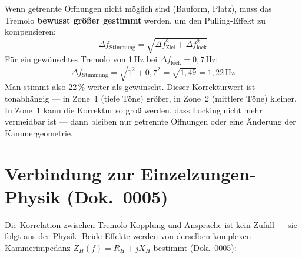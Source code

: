 \documentclass[11pt,a4paper]{article}
\begin{document}
Wenn getrennte Öffnungen nicht möglich sind (Bauform, Platz), muss das Tremolo \textbf{bewusst größer gestimmt} werden, um den Pulling-Effekt zu kompensieren:
\begin{equation}
\Delta f_\text{Stimmung} = \sqrt{\Delta f_\text{Ziel}^2 + \Delta f_\text{lock}^2}
\end{equation}
Für ein gewünschtes Tremolo von 1\,Hz bei $\Delta f_\text{lock} = 0{,}7$\,Hz:
\begin{equation}
\Delta f_\text{Stimmung} = \sqrt{1^2 + 0{,}7^2} = \sqrt{1{,}49} = 1{,}22\,\text{Hz}
\end{equation}
Man stimmt also 22\,\% weiter als gewünscht. Dieser Korrekturwert ist tonabhängig --- in Zone~1 (tiefe Töne) größer, in Zone~2 (mittlere Töne) kleiner. In Zone~1 kann die Korrektur so groß werden, dass Locking nicht mehr vermeidbar ist --- dann bleiben nur getrennte Öffnungen oder eine Änderung der Kammergeometrie.

\begin{table}[H]
\centering\small
\caption{Stimm-Kompensationstabelle (gemeinsame Öffnung, volle Lautstärke)}
\end{table}

\section{Verbindung zur Einzelzungen-Physik (Dok.~0005)}

Die Korrelation zwischen Tremolo-Kopplung und Ansprache ist kein Zufall --- sie folgt aus der Physik. Beide Effekte werden von derselben komplexen Kammerimpedanz $Z_H(f) = R_H + jX_H$ bestimmt (Dok.~0005):
\end{document}
